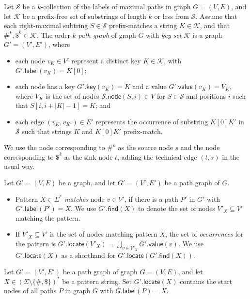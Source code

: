 \documentclass[a4paper,UKenglish]{lipics-v2016}
\newcommand{\set}[1]{\ensuremath{\{ #1 \}}}
\newcommand{\abs}[1]{\ensuremath{\lvert #1 \rvert}}
\newcommand{\find}{\ensuremath{\mathsf{find}}}
\newcommand{\locate}{\ensuremath{\mathsf{locate}}}
\newcommand{\glabel}{\ensuremath{\mathsf{label}}}
\newcommand{\gkey}{\ensuremath{\mathsf{key}}}
\newcommand{\gvalue}{\ensuremath{\mathsf{value}}}
\newcommand{\gnode}{\ensuremath{\mathsf{node}}}
\newcommand{\kcollection}[1]{$#1$\nobreakdash-collection}
\newcommand{\orderk}[1]{order\nobreakdash-$#1$}
\newcommand{\patternset}{\ensuremath{(\Sigma \setminus \set{\#, \$})^{\ast}}}
\begin{document}
\begin{definition}
Let $\mathcal{S}$ be a \kcollection{k} of the labels of maximal paths in graph $G = (V, E)$, and let $\mathcal{K}$ be a prefix-free set of substrings of length $k$ or less from $\mathcal{S}$. Assume that each right-maximal subtring $S \in \mathcal{S}$ prefix-matches a string $K \in \mathcal{K}$, and that $\#^{k}, \$^{k} \in \mathcal{K}$. The \orderk{k} \emph{path graph} of graph $G$ with \emph{key set} $\mathcal{K}$ is a graph $G' = (V', E')$, where
\begin{itemize}
\item each node $v_{K} \in V'$ represent a distinct key $K \in \mathcal{K}$, with $G'.\glabel(v_{K}) = K[0]$;
\item each node has a key $G'.\gkey(v_{K}) = K$ and a value $G'.\gvalue(v_{K}) = V_{K}$, where $V_{K}$ is the set of nodes $\mathcal{S}.\gnode(S, i) \in V$ for $S \in \mathcal{S}$ and positions $i$ such that $S[i, i+\abs{K}-1] = K$; and
\item each edge $(v_{K}, v_{K'}) \in E'$ represents the occurrence of substring $K[0] K'$ in $\mathcal{S}$ such that strings $K$ and $K[0] K'$ prefix-match.
\end{itemize}
We use the node corresponding to $\#^{k}$ as the source node $s$ and the node corresponding to $\$^{k}$ as the sink node $t$, adding the technical edge $(t, s)$ in the usual way.
\end{definition}

\begin{definition}
Let $G' = (V, E)$ be a graph, and let $G' = (V', E')$ be a path graph of $G$.
\begin{itemize}
\item Pattern $X \in \Sigma^{\ast}$ \emph{matches} node $v \in V'$, if there is a path $P'$ in $G'$ with $G'.\glabel(P') = X$. We use $G'.\find(X)$ to denote the set of nodes $V'_{X} \subseteq V'$ matching the pattern.
\item If $V'_{X} \subseteq V'$ is the set of nodes matching pattern $X$, the set of \emph{occurrences} for the pattern is $G'.\locate(V'_{X}) = \bigcup_{v \in V'_{X}} G'.\gvalue(v)$. We use $G'.\locate(X)$ as a shorthand for $G'.\locate(G'.\find(X))$.
\end{itemize}
\end{definition}

\begin{lemma}\label{lemma:pg-fn}
Let $G' = (V', E')$ be a path graph of graph $G = (V, E)$, and let $X \in \patternset$ be a pattern string. Set $G'.\locate(X)$ contains the start nodes of all paths $P$ in graph $G$ with $G.\glabel(P) = X$.
\end{lemma}
\end{document}
